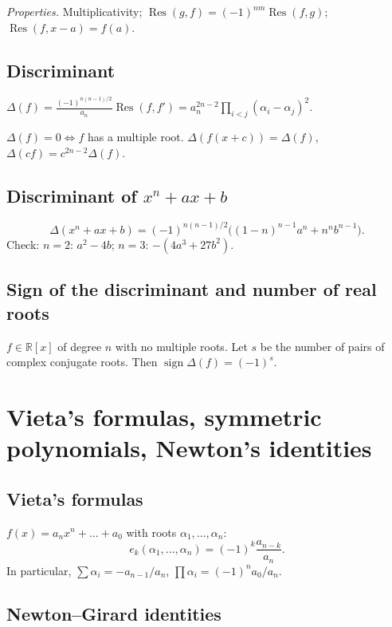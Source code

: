 \textit{Properties.} Multiplicativity; $\operatorname{Res}(g,f)=(-1)^{nm}\operatorname{Res}(f,g)$; $\operatorname{Res}(f,x-a)=f(a)$.

\subsection{Discriminant}
\label{subsec:discriminant}

$\Delta(f)=\frac{(-1)^{n(n-1)/2}}{a_n}\operatorname{Res}(f,f')=a_n^{2n-2}\prod_{i<j}(\alpha_i-\alpha_j)^2.$

$\Delta(f)=0 \iff f$ has a multiple root. $\Delta(f(x+c))=\Delta(f)$, $\Delta(cf)=c^{2n-2}\Delta(f)$.

\subsection{Discriminant of $x^n+ax+b$}
\label{subsec:discriminant-trinomial}

$$\Delta(x^n+ax+b)=(-1)^{n(n-1)/2}\bigl((1-n)^{n-1}a^n+n^n b^{n-1}\bigr).$$
Check: $n=2$: $a^2-4b$; $n=3$: $-(4a^3+27b^2)$.

\subsection{Sign of the discriminant and number of real roots}
\label{subsec:discriminant-real}

$f\in\mathbb{R}[x]$ of degree $n$ with no multiple roots. Let $s$ be the number of pairs of complex conjugate roots. Then $\operatorname{sign}\Delta(f)=(-1)^s$.

\medskip

\section{Vieta's formulas, symmetric polynomials, Newton's identities}
\label{sec:vieta-symmetric}

\subsection{Vieta's formulas}
\label{subsec:vieta}

$f(x)=a_nx^n+\dots+a_0$ with roots $\alpha_1,\dots,\alpha_n$:
$$e_k(\alpha_1,\dots,\alpha_n)=(-1)^k\frac{a_{n-k}}{a_n}.$$
In particular, $\sum\alpha_i=-a_{n-1}/a_n$, $\prod\alpha_i=(-1)^n a_0/a_n$.

\subsection{Newton--Girard identities}
\label{subsec:newton-girard}

